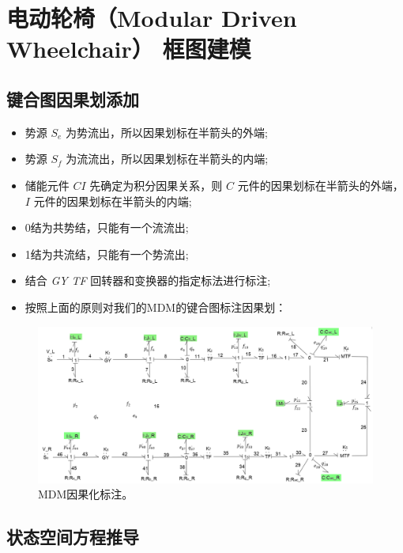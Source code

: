 \section{电动轮椅（Modular  Driven Wheelchair） 框图建模}

\subsection{键合图因果划添加}

\begin{itemize}
	\item 	势源 $S_e$ 为势流出，所以因果划标在半箭头的外端;
	\item 势源 $S_f$ 为流流出，所以因果划标在半箭头的内端;
	\item 储能元件 $C I$ 先确定为积分因果关系，则 $C$ 元件的因果划标在半箭头的外端， $I$ 元件的因果划标在半箭头的内端;
	\item 0结为共势结，只能有一个流流出;
	\item 1结为共流结，只能有一个势流出;
	\item 结合 \textit{GY} \textit{TF} 回转器和变换器的指定标法进行标注;
	\item 按照上面的原则对我们的MDM的键合图标注因果划：
	
\end{itemize}
\begin{figure}[h]
	\centering
	\includegraphics[width=\textwidth]{fig/MDM.png}
	\caption{MDM因果化标注。}\label{fig:mdm}
\end{figure}
\subsection{状态空间方程推导}
